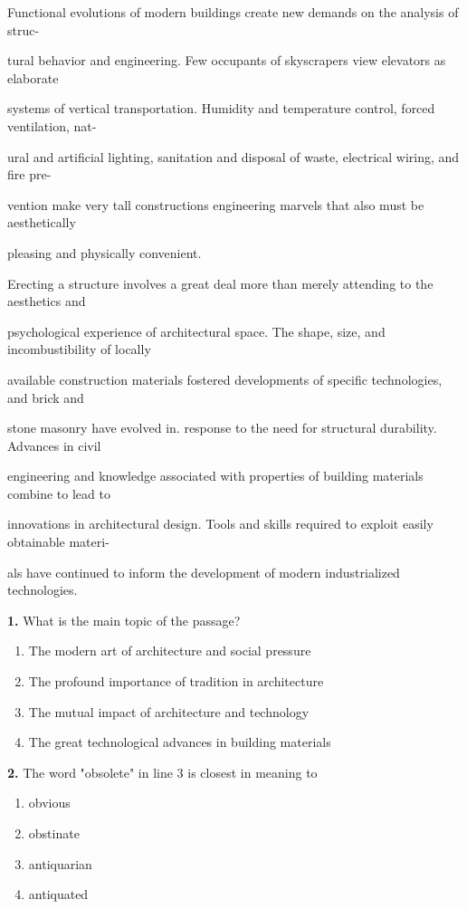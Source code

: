 \documentclass[12pt]{article}
\begin{document}
Functional evolutions of modern buildings create new demands on the analysis of struc-\par
tural behavior and engineering. Few occupants of skyscrapers view elevators as elaborate\par
systems of vertical transportation. Humidity and temperature control, forced ventilation, nat-\par
ural and artificial lighting, sanitation and disposal of waste, electrical wiring, and fire pre-\par
vention make very tall constructions engineering marvels that also must be aesthetically\par
pleasing and physically convenient.\par
Erecting a structure involves a great deal more than merely attending to the aesthetics and\par
psychological experience of architectural space. The shape, size, and incombustibility of locally\par
available construction materials fostered developments of specific technologies, and brick and\par
stone masonry have evolved in. response to the need for structural durability. Advances in civil\par
engineering and knowledge associated with properties of building materials combine to lead to\par
innovations in architectural design. Tools and skills required to exploit easily obtainable materi-\par
als have continued to inform the development of modern industrialized technologies.\par
\endgroup
\medskip
\noindent\textbf{1.} What is the main topic of the passage?
\begin{enumerate}[label=(\Alph*),leftmargin=*,itemsep=0.2em]
\item The modern art of architecture and social pressure
\item The profound importance of tradition in architecture
\item The mutual impact of architecture and technology
\item The great technological advances in building materials
\end{enumerate}
\par
\vspace{0.25\baselineskip}
\noindent\textbf{2.} The word "obsolete" in line 3 is closest in meaning to
\begin{enumerate}[label=(\Alph*),leftmargin=*,itemsep=0.2em]
\item obvious
\item obstinate
\item antiquarian
\item antiquated
\end{enumerate}
\end{document}
